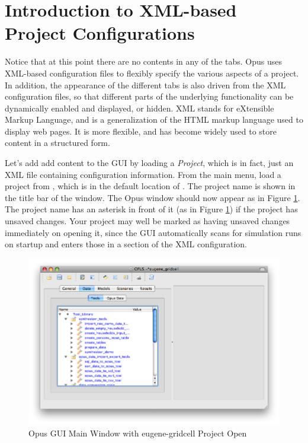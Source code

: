 \section{Introduction to XML-based Project Configurations}
\label{sec:intro-to-xml-based-project-configurations}

Notice that at this point there are no contents in any of the tabs.
Opus uses XML-based configuration files to flexibly specify the various
aspects of a project.  In addition, the appearance of the different tabs is
also driven from the XML configuration files, so that different parts of
the underlying functionality can be dynamically enabled and displayed, or
hidden.  XML stands for eXtensible Markup Language, and is a generalization
of the HTML markup language used to display web pages.  It is more
flexible, and has become widely used to store content in a structured form.

Let's add add content to the GUI by loading a \emph{Project}, which is in
fact, just an XML file containing configuration information.  From the main
menu, load a project from , which is in the
default location of .  The project name is shown
in the title bar of the window.  The Opus window should now appear as in
Figure \ref{fig:opus2}.  The project name has an asterisk in front of it
(as in Figure \ref{fig:opus2}) if the project has unsaved changes.  Your
project may well be marked as having unsaved changes immediately on opening
it, since the GUI automatically scans for simulation runs on startup and
enters those in a section of the XML configuration.

\begin{figure}[htp]
\begin{center}
\includegraphics[scale=0.52]{part-gui/images/opus-open-project.png}
\end{center}
\caption{Opus GUI Main Window with eugene-gridcell Project Open}
\label{fig:opus2}
\end{figure}

